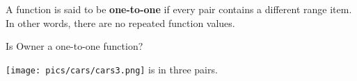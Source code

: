\documentclass{ximera}
\begin{document}
\begin{definition}
  A function is said to be \textbf{one-to-one} if every pair contains a different range item.   In other words, there are no repeated function values.
  
\end{definition}



\begin{exercise}
 Is Owner a one-to-one function?
  \begin{multipleChoice}
  \end{multipleChoice}
  \begin{feedback}
\texttt{[image: pics/cars/cars3.png]} is in three pairs.
  \end{feedback}
\end{exercise}
\end{document}

